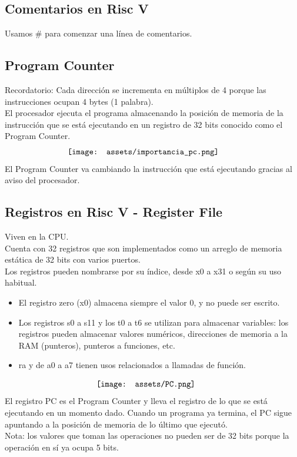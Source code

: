 \documentclass[10pt,a4paper]{article}
\begin{document}
\subsection*{Comentarios en Risc V}
Usamos \# para comenzar una línea de comentarios.
\subsection*{Program Counter}
Recordatorio: Cada dirección se incrementa en múltiplos de 4 porque las instrucciones ocupan 4 bytes (1 palabra). \\
El procesador ejecuta el programa almacenando la posición de memoria de la instrucción que se está ejecutando en un registro de 32 bits conocido como el Program Counter.
\[\begin{minipage}[b]{0.6\textwidth}
    \texttt{[image: assets/importancia\_pc.png]}
    \label{fig:importancia_pc}
\end{minipage}\] 
El Program Counter va cambiando la instrucción que está ejecutando gracias al aviso del procesador.
\subsection*{Registros en Risc V - Register File}
Viven en la CPU. \\ 
Cuenta con 32 registros que son implementados como un arreglo de memoria estática de 32 bits con varios puertos. \\
Los registros pueden nombrarse por su índice, desde x0 a x31 o según su uso habitual.
\begin{itemize}
    \item El registro zero (x0) almacena siempre el valor 0, y no puede ser escrito.
    \item Los registros s0 a s11 y los t0 a t6 se utilizan para almacenar variables: los registros pueden almacenar valores numéricos, direcciones de memoria a la RAM (punteros), punteros a funciones, etc.
    \item ra y de a0 a a7 tienen usos relacionados a llamadas de función.
\end{itemize}
\[\begin{minipage}[b]{0.4\textwidth}
    \texttt{[image: assets/PC.png]}
    \label{fig:PC}
\end{minipage}\]
El registro PC es el Program Counter y lleva el registro de lo que se está ejecutando en un momento dado. Cuando un programa ya termina, el PC sigue apuntando a la posición de memoria de lo último que ejecutó. \\
Nota: los valores que toman las operaciones no pueden ser de 32 bits porque la operación en sí ya ocupa 5 bits. \\
\end{document}
